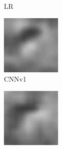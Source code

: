 \begin{figure}[H]
\begin{subfigure}[t]{0.15\textwidth}
    \caption{LR}
  \end{subfigure}
  \begin{subfigure}[t]{0.15\textwidth}
    \includegraphics[width=\linewidth]{img/ten-trials/prediction_2_cnnv1.png}
    \caption{CNNv1}
  \end{subfigure}
  \begin{subfigure}[t]{0.15\textwidth}
    \includegraphics[width=\linewidth]{img/ten-trials/prediction_2_cnnv2.png}

\end{subfigure}
\end{figure}
